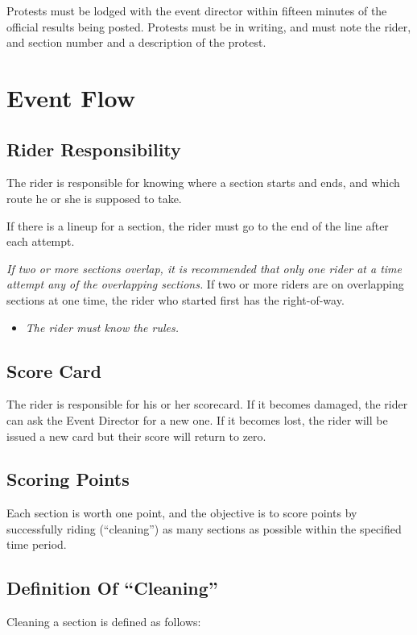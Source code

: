 Protests must be lodged with the event director within fifteen minutes of the official results being posted. 
Protests must be in writing, and must note the rider, and section number and a description of the protest.

\section{Event Flow}

\subsection{Rider Responsibility}

The rider is responsible for knowing where a section starts and ends, and which route he or she is supposed to take.

If there is a lineup for a section, the rider must go to the end of the line after each attempt.

\textit{If two or more sections overlap, it is recommended that only one rider at a time attempt any of the overlapping sections. }
If two or more riders are on overlapping sections at one time, the rider who started first has the right-of-way.

\begin{itemize}
\item \textit{The rider must know the rules.}
\end{itemize}

\subsection{Score Card}
The rider is responsible for his or her scorecard. 
If it becomes damaged, the rider can ask the Event Director for a new one. 
If it becomes lost, the rider will be issued a new card but their score will return to zero.

\subsection{Scoring Points}
Each section is worth one point, and the objective is to score points by successfully riding (``cleaning'') as many sections as possible within the specified time period.

\subsection{Definition Of ``Cleaning''}
Cleaning a section is defined as follows:

